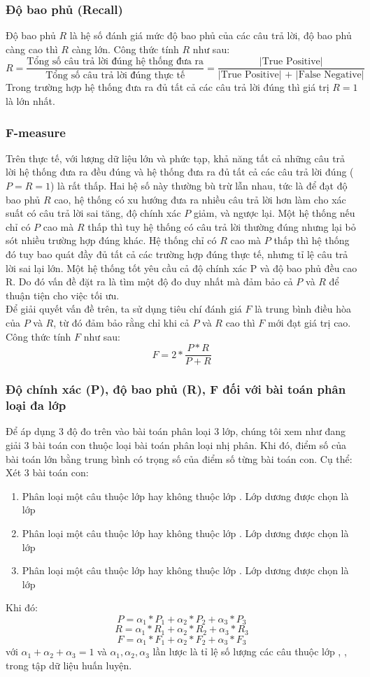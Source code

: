 \subsubsection*{Độ bao phủ (Recall)}
Độ bao phủ \(R\) là hệ số đánh giá mức độ bao phủ của các câu trả lời, độ bao phủ càng cao thì \(R\) càng lớn. Công thức tính \(R\) như sau:
$$R=\frac{\text{Tổng số câu trả lời đúng hệ thống đưa ra}}{\text{Tổng số câu trả lời đúng thực tế}} = \frac{\text{|True Positive|}}{\text{|True Positive| + |False Negative|}}$$
Trong trường hợp hệ thống đưa ra đủ tất cả các câu trả lời đúng thì giá trị $R=1$ là lớn nhất.
\subsubsection*{F-measure}
Trên thực tế, với lượng dữ liệu lớn và phức tạp, khả năng tất cả những câu trả lời hệ thống đưa ra đều đúng và hệ thống đưa ra đủ tất cả các câu trả lời đúng ($P=R=1$) là rất thấp. Hai hệ số này thường bù trừ lẫn nhau, tức là để đạt độ bao phủ \(R\) cao, hệ thống có xu hướng đưa ra nhiều câu trả lời hơn làm cho xác suất có câu trả lời sai tăng, độ chính xác \(P\)  giảm, và ngược lại. Một hệ thống nếu chỉ có \(P\) cao mà \(R\) thấp thì tuy hệ thống có câu trả lời thường đúng nhưng lại bỏ sót nhiều trường hợp đúng khác. Hệ thống chỉ có \(R\) cao mà \(P\) thấp thì hệ thống đó tuy bao quát đầy đủ tất cả các trường hợp đúng thực tế, nhưng tỉ lệ câu trả lời sai lại lớn. Một hệ thống tốt yêu cầu cả độ chính xác P và độ bao phủ đều cao R. Do đó vấn đề đặt ra là tìm một độ đo duy nhất mà đảm bảo cả \(P\) và \(R\) để thuận tiện cho việc tối ưu.\\

Để giải quyết vấn đề trên, ta sử dụng tiêu chí đánh giá \(F\) là trung bình điều hòa của \(P\) và \(R\), từ đó đảm bảo rằng chỉ khi cả \(P\) và \(R\) cao thì \(F\) mới đạt giá trị cao. Công thức tính \(F\) như sau:
$$F=2*\frac{P*R}{P + R} $$
\subsubsection*{Độ chính xác (P), độ bao phủ (R), F đối với bài toán phân loại đa lớp}
Để áp dụng 3 độ đo trên vào bài toán phân loại 3 lớp, chúng tôi xem như đang giải 3 bài toán con thuộc loại bài toán phân loại nhị phân. Khi đó, điểm số của bài toán lớn bằng trung bình có trọng số của điểm số từng bài toán con. Cụ thể:
Xét 3 bài toán con:
\begin{enumerate}
\item Phân loại một câu thuộc lớp \tichcuc hay không thuộc lớp \tichcuc. Lớp dương được chọn là lớp \tichcuc
\item Phân loại một câu thuộc lớp \tieucuc hay không thuộc lớp \tieucuc. Lớp dương được chọn là lớp \tieucuc
\item Phân loại một câu thuộc lớp \trungtinh hay không thuộc lớp \trungtinh. Lớp dương được chọn là lớp \trungtinh
\end{enumerate}
Khi đó:
$$P = \alpha_1*P_1 + \alpha_2*P_2 + \alpha_3*P_3$$
$$R = \alpha_1*R_1 + \alpha_2*R_2 + \alpha_3*R_3$$
$$F = \alpha_1*F_1 + \alpha_2*F_2 + \alpha_3*F_3$$
với $\alpha_1 + \alpha_2 + \alpha_3 = 1$ và $\alpha_1, \alpha_2, \alpha_3$ lần lược là tỉ lệ số lượng các câu thuộc lớp \tichcuc, \tieucuc, \trungtinh trong tập dữ liệu huấn luyện.
